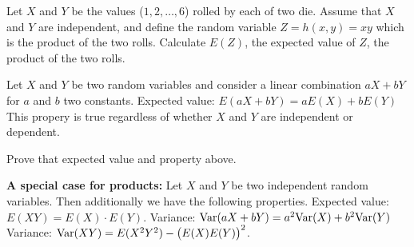 \bb[resume]
\ii Let $X$ and $Y$ be the values ($1, 2, \ldots ,6$) rolled by each of two die. Assume that $X$ and $Y$ are independent,
and define the random variable $Z=h(x,y)=xy$ which is the product of the two rolls. Calculate $E(Z)$,
the expected value of $Z$, the product of the two rolls.\label{pair-die}
\ee

\vfill

\clearpage


\bbox
Let $X$ and $Y$ be two random variables and consider a linear combination $aX+bY$ for $a$ and $b$ two constants.
\bi
\ii Expected value: \alert{$E(aX+bY)=aE(X)+bE(Y)$}
\ii This propery is true regardless of whether $X$ and $Y$ are independent or dependent.
\ei
\ebox

\bb[resume]
\ii Prove that expected value and property above. \vfill
\ee



\bbox
\textbf{A special case for products:} Let $X$ and $Y$ be two \alert{independent} random variables. Then additionally we have the following properties.
\bi
\ii Expected value: \alert{$E(XY) = E(X) \cdot E(Y)$}.
\ii Variance: \alert{$\mbox{Var}(aX+bY)=a^2\mbox{Var}(X)+b^2\mbox{Var}(Y)$}
\ii Variance: \alert{$\mbox{Var}(XY) = E(X^2Y^2) - \big( E(X)E(Y) \big)^2$}.
\ii {}
\ei
\ebox





